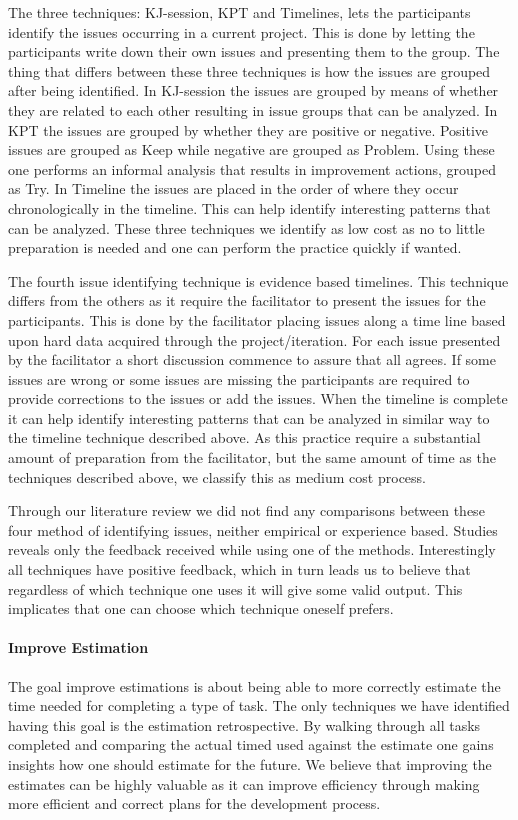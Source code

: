 \documentclass[12pt]{article}
\begin{document}
The three techniques: KJ-session, KPT and Timelines, lets the participants identify the issues occurring in a current project. This is done by letting the participants write down their own issues and presenting them to the group. The thing that differs between these three techniques is how the issues are grouped after being identified. In KJ-session the issues are grouped by means of whether they are related to each other resulting in issue groups that can be analyzed. In KPT the issues are grouped by whether they are positive or negative. Positive issues are grouped as Keep while negative are grouped as Problem. Using these one performs an informal analysis that results in improvement actions, grouped as Try. In Timeline the issues are placed in the order of where they occur  chronologically in the timeline. This can help identify interesting patterns that can be analyzed. These three techniques we identify as low cost as no to little preparation is needed and one can perform the practice quickly if wanted. 

The fourth issue identifying technique is evidence based timelines. This technique differs from the others as it require the facilitator to present the issues for the participants. This is done by the facilitator placing issues along a time line based upon hard data acquired through the project/iteration. For each issue presented by the facilitator a short discussion commence to assure that all agrees. If some issues are wrong or some issues are missing the participants are required to provide corrections to the issues or add the issues. When the timeline is complete it can help identify interesting patterns that can be analyzed in similar way to the timeline technique described above. As this practice require a substantial amount of preparation from the facilitator, but the same amount of time as the techniques described above, we classify this as medium cost process.

Through our literature review we did not find any comparisons between these four method of identifying issues, neither empirical or experience based. Studies reveals only the feedback received while using one of the methods. Interestingly all techniques have positive feedback, which in turn leads us to believe that regardless of which technique one uses it will give some valid output. This implicates that one can choose which technique oneself prefers.

\paragraph{Improve Estimation}
The goal improve estimations is about being able to more correctly estimate the time needed for completing a type of task. The only techniques we have identified having this goal is the estimation retrospective. By walking through all tasks completed and comparing the actual timed used against the estimate one gains insights how one should estimate for the future. We believe that improving the estimates can be highly valuable as it can improve efficiency through making more efficient and correct plans for the development process. 
\end{document}

